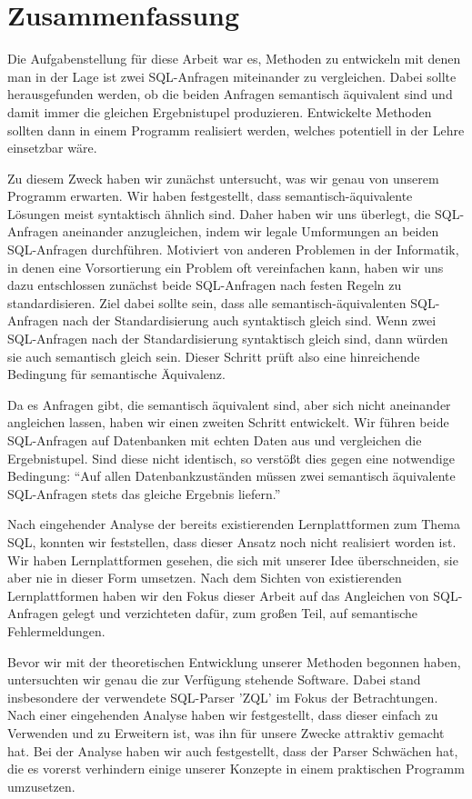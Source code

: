 
\section{Zusammenfassung}

Die Aufgabenstellung für diese Arbeit war es, Methoden zu entwickeln mit denen man in der Lage ist zwei SQL-Anfragen miteinander zu vergleichen. Dabei sollte herausgefunden werden, ob die beiden Anfragen semantisch äquivalent sind und damit immer die gleichen Ergebnistupel produzieren. Entwickelte Methoden sollten dann in einem Programm realisiert werden, welches potentiell in der Lehre einsetzbar wäre. 

Zu diesem Zweck haben wir zunächst untersucht, was wir genau von unserem Programm erwarten. Wir haben festgestellt, dass semantisch-äquivalente Lösungen meist syntaktisch ähnlich sind. Daher haben wir uns überlegt, die SQL-Anfragen aneinander anzugleichen, indem wir legale Umformungen an beiden SQL-Anfragen durchführen. Motiviert von anderen Problemen in der Informatik, in denen eine Vorsortierung ein Problem oft vereinfachen kann, haben wir uns dazu entschlossen zunächst beide SQL-Anfragen nach festen Regeln zu standardisieren. Ziel dabei sollte sein, dass alle semantisch-äquivalenten SQL-Anfragen nach der Standardisierung auch syntaktisch gleich sind. Wenn zwei SQL-Anfragen nach der Standardisierung syntaktisch gleich sind, dann würden sie auch semantisch gleich sein. Dieser Schritt prüft also eine hinreichende Bedingung für semantische Äquivalenz.

Da es Anfragen gibt, die semantisch äquivalent sind, aber sich nicht aneinander angleichen lassen, haben wir einen zweiten Schritt entwickelt. Wir führen beide SQL-Anfragen auf Datenbanken mit echten Daten aus und vergleichen die Ergebnistupel. Sind diese nicht identisch, so verstößt dies gegen eine notwendige Bedingung: ``Auf allen Datenbankzuständen müssen zwei semantisch äquivalente SQL-Anfragen stets das gleiche Ergebnis liefern.'' 

Nach eingehender Analyse der bereits existierenden Lernplattformen zum Thema SQL, konnten wir feststellen, dass dieser Ansatz noch nicht realisiert worden ist. Wir haben Lernplattformen gesehen, die sich mit unserer Idee überschneiden, sie aber nie in dieser Form umsetzen. Nach dem Sichten von existierenden Lernplattformen haben wir den Fokus dieser Arbeit auf das Angleichen von SQL-Anfragen gelegt und verzichteten dafür, zum großen Teil, auf semantische Fehlermeldungen. 

Bevor wir mit der theoretischen Entwicklung unserer Methoden begonnen haben, untersuchten wir genau die zur Verfügung stehende Software. Dabei stand insbesondere der verwendete SQL-Parser 'ZQL' im Fokus der Betrachtungen. Nach einer eingehenden Analyse haben wir festgestellt, dass dieser einfach zu Verwenden und zu Erweitern ist, was ihn für unsere Zwecke attraktiv gemacht hat. Bei der Analyse haben wir auch festgestellt, dass der Parser Schwächen hat, die es vorerst verhindern einige unserer Konzepte in einem praktischen Programm umzusetzen.

